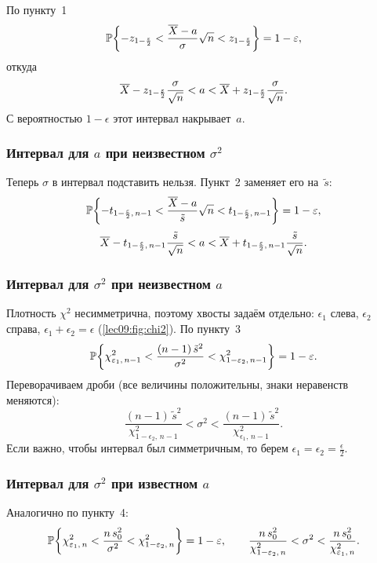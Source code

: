 По пункту~1
\[
  \P\biggl\{-z_{1-\frac\epsilon2} < \frac{\Xbar - a}{\sigma}\sqrt{n} < z_{1-\frac\epsilon2}\biggr\} = 1 - \epsilon,
\]
откуда
\[
  \Xbar - z_{1-\frac\epsilon2} \frac{\sigma}{\sqrt n} < a < \Xbar + z_{1-\frac\epsilon2} \frac{\sigma}{\sqrt n}.
\]
С вероятностью $1 - \epsilon$ этот интервал накрывает~$a$.

\subsubsection{Интервал для \texorpdfstring{$a$}{a} при неизвестном \texorpdfstring{$\sigma^2$}{σ²}}

Теперь $\sigma$ в интервал подставить нельзя. Пункт~2 заменяет его на~$\tilde s$:
\[
  \P\biggl\{-t_{1-\frac\epsilon2,\,n-1} < \frac{\Xbar - a}{\tilde s}\sqrt{n} < t_{1-\frac\epsilon2,\,n-1}\biggr\} = 1 - \epsilon,
\]
\[
  \Xbar - t_{1-\frac\epsilon2,\,n-1} \frac{\tilde s}{\sqrt n} < a < \Xbar + t_{1-\frac\epsilon2,\,n-1} \frac{\tilde s}{\sqrt n}.
\]

\subsubsection{Интервал для \texorpdfstring{$\sigma^2$}{σ²} при неизвестном \texorpdfstring{$a$}{a}}

Плотность $\chi^2$ несимметрична, поэтому хвосты задаём отдельно: $\epsilon_1$ слева,
$\epsilon_2$ справа, $\epsilon_1 + \epsilon_2 = \epsilon$ (\cref{lec09:fig:chi2}). По пункту~3
\[
  \P\biggl\{\chi^2_{\epsilon_1,\,n-1} < \frac{(n-1)\,\tilde s^2}{\sigma^2} < \chi^2_{1-\epsilon_2,\,n-1}\biggr\} = 1 - \epsilon.
\]
Переворачиваем дроби (все величины положительны, знаки неравенств меняются):
\[
  \frac{(n-1)\,\tilde s^2}{\chi^2_{1-\epsilon_2,\,n-1}} < \sigma^2 < \frac{(n-1)\,\tilde s^2}{\chi^2_{\epsilon_1,\,n-1}}.
\]
Если важно, чтобы интервал был симметричным, то берем $\epsilon_1 = \epsilon_2 = \frac\epsilon2$.

\subsubsection{Интервал для \texorpdfstring{$\sigma^2$}{σ²} при известном \texorpdfstring{$a$}{a}}

Аналогично по пункту~4:
\[
  \P\biggl\{\chi^2_{\epsilon_1,\,n} < \frac{n\, s_0^2}{\sigma^2} < \chi^2_{1-\epsilon_2,\,n}\biggr\} = 1 - \epsilon,
  \qquad
  \frac{n\, s_0^2}{\chi^2_{1-\epsilon_2,\,n}} < \sigma^2 < \frac{n\, s_0^2}{\chi^2_{\epsilon_1,\,n}}.
\]

